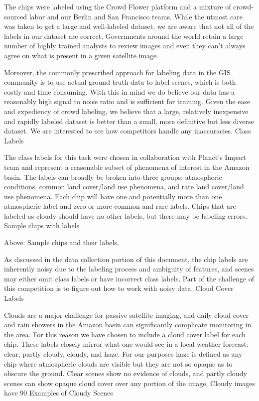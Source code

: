 The chips were labeled using the Crowd Flower platform and a mixture of crowd-sourced labor and our Berlin and San Francisco teams. While the utmost care was taken to get a large and well-labeled dataset, we are aware that not all of the labels in our dataset are correct. Governments around the world retain a large number of highly trained analysts to review images and even they can't always agree on what is present in a given satellite image.

Moreover, the commonly prescribed approach for labeling data in the GIS community is to use actual ground truth data to label scenes, which is both costly and time consuming. With this in mind we do believe our data has a reasonably high signal to noise ratio and is sufficient for training. Given the ease and expediency of crowd labeling, we believe that a large, relatively inexpensive and rapidly labeled dataset is better than a small, more definitive but less diverse dataset. We are interested to see how competitors handle any inaccuracies.
Class Labels

The class labels for this task were chosen in collaboration with Planet's Impact team and represent a reasonable subset of phenomena of interest in the Amazon basin. The labels can broadly be broken into three groups: atmospheric conditions, common land cover/land use phenomena, and rare land cover/land use phenomena. Each chip will have one and potentially more than one atmospheric label and zero or more common and rare labels. Chips that are labeled as cloudy should have no other labels, but there may be labeling errors. Sample chips with labels

Above: Sample chips and their labels.

As discussed in the data collection portion of this document, the chip labels are inherently noisy due to the labeling process and ambiguity of features, and scenes may either omit class labels or have incorrect class labels. Part of the challenge of this competition is to figure out how to work with noisy data.
Cloud Cover Labels

Clouds are a major challenge for passive satellite imaging, and daily cloud cover and rain showers in the Amazon basin can significantly complicate monitoring in the area. For this reason we have chosen to include a cloud cover label for each chip. These labels closely mirror what one would see in a local weather forecast: clear, partly cloudy, cloudy, and haze. For our purposes haze is defined as any chip where atmospheric clouds are visible but they are not so opaque as to obscure the ground. Clear scenes show no evidence of clouds, and partly cloudy scenes can show opaque cloud cover over any portion of the image. Cloudy images have 90%
Examples of Cloudy Scenes

